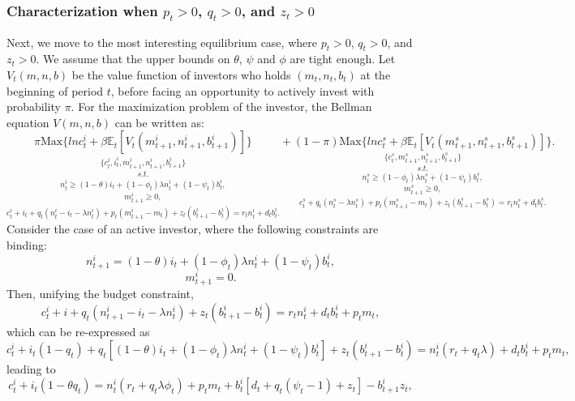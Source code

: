 \documentclass[12pt]{article}%
\begin{document}
\subsubsection{Characterization when $p_t >0$, $q_t > 0$, and $z_t > 0$}
Next, we move to the most interesting equilibrium case, where $p_t >0$, $q_t >
0$, and $z_t > 0$. We assume that the upper bounds on $\theta$, $\psi$ and
$\phi$ are tight enough. Let $V_t(m,n,b)$ be the value function of investors who
holds $(m_t, n_t, b_t)$ at the beginning of period $t$, before facing an
opportunity to actively invest with probability $\pi$. For the maximization problem of
the investor, the Bellman equation $V(m,n,b)$ can
be written as:
\begin{equation}
\underset{c^i_t +i_t+q_t (n^i_t -i_t -\lambda n^i_t)+p_t(m^i_{t+1}-m_t)
+z_t(b^i_{t+1}-b^i_t) = r_t n^i_t + d_t b^i_t.
}{\underset{m^i_{t+1} \ge 0,} {\underset{n^i_t \ge (1-\theta)i_t + (1-\phi_t)\lambda n^i_t +(1-\psi_t)b^i_t,}{\underset{s.t.}{\underset{ \{c^i_t, i^i_t, m^i_{t+1}, n^i_{t+1}, b^i_{t+1}\} } {\pi \text{Max} \{ln c^i_t + 
\beta \mathbb{E}_t [V_t (m^i_{t+1}, n^i_{t+1}, b^i_{t+1})]\}}}}}}
+
\underset{c^s_t +q_t (n^s_t -\lambda n^s_t)+p_t(m^s_{t+1}-m_t)
+z_t(b^s_{t+1}-b^s_t) = r_t n^s_t + d_t b^s_t.
}{\underset{m^s_{t+1} \ge 0,} {\underset{n^s_t \ge (1-\phi_t)\lambda n^s_t +(1-\psi_t)b^s_t,}{\underset{s.t.}{\underset{ \{c^s_t, m^s_{t+1}, n^s_{t+1}, b^s_{t+1}\} } {(1-\pi) \text{Max} \{ln c^s_t + 
\beta \mathbb{E}_t [V_t (m^s_{t+1}, n^s_{t+1}, b^s_{t+1})]\}}}}}}.
\end{equation}
Consider the case of an active investor, where the following constraints are
binding:
\begin{equation}
n^i_{t+1} = (1-\theta)i_t + (1-\phi_t)\lambda n^i_t + (1-\psi_t)b^i_t,
\end{equation}
\begin{equation}
m^i_{t+1} = 0.
\end{equation}
Then, unifying the budget constraint,
\begin{equation}
c^i_t+i+q_t(n^i_{t+1}-i_t-\lambda n^i_t)+z_t (b^i_{t+1}-b^i_t) = r_t n^i_t +d_t
b^i_t + p_t m_t,
\end{equation}
which can be re-expressed as
\begin{equation}
c^i_t + i_t(1-q_t)+q_t[(1-\theta)i_t +(1-\phi_t)\lambda n^i_t
+(1-\psi_t)b^i_t]+z_t(b^i_{t+1}-b^i_t) = n^i_t (r_t +q_t \lambda) + d_t b^i_t + p_t m_t, 
\end{equation}
leading to
\begin{equation}
c^i_t+i_t(1-\theta q_t) = n^i_t (r_t +q_t \lambda \phi_t)+p_t m_t + b^i_t [d_t +q_t (\psi_t
-1)+z_t]-b^i_{t+1}z_t,
\end{equation}
\end{document}
